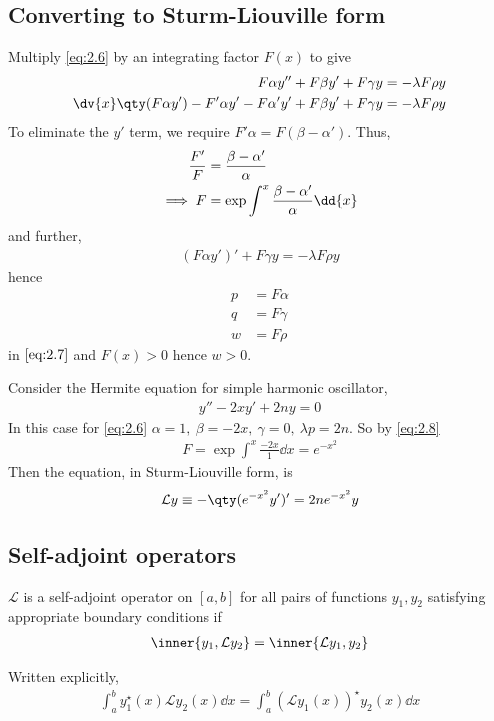 \subsection{Converting to Sturm-Liouville form}
Multiply \cref{eq:2.6} by an integrating factor $F(x)$ to give
\begin{align*}
    F \alpha y'' + F \beta y' + F \gamma y &= -\lambda F \rho y \\
    \dv{x} \qty(F \alpha y') - F' \alpha y' - F \alpha' y' + F \beta y' + F \gamma y &= -\lambda F \rho y
\end{align*}
To eliminate the $y'$ term, we require $F'\alpha = F(\beta - \alpha')$.
Thus,
\begin{align}
    \frac{F'}{F} &= \frac{\beta - \alpha'}{\alpha} \notag \\
    \implies F &= \exp \int^x \frac{\beta - \alpha'}{\alpha} \dd{x} \label{eq:2.8}
\end{align}
and further,
\begin{align*}
    (F\alpha y')' + F \gamma y = - \lambda F \rho y
\end{align*}
hence
\begin{align*}
    p & = F \alpha \\
    q & = F \gamma \\
    w & = F \rho
\end{align*} in $\cref{eq:2.7}$ and $F(x) > 0$ hence $w > 0$.
\begin{example}
    Consider the Hermite equation for simple harmonic oscillator,
    \begin{align*}
        y'' - 2xy' + 2ny = 0
    \end{align*}
    In this case for \cref{eq:2.6} $\alpha = 1,\ \beta = -2x,\ \gamma = 0,\ \lambda p = 2n$.
    So by \cref{eq:2.8}
    \begin{align*}
        F = \exp \int^x \frac{-2x}{1} \dd{x} = e^{-x^2}
    \end{align*}
    Then the equation, in Sturm-Liouville form, is
    \begin{align}
        \mathcal L y \equiv -\qty(e^{-x^2} y')' = 2n e^{-x^2} y \label{eq:2.9}
    \end{align}
\end{example}

\subsection{Self-adjoint operators}
\begin{definition}
    $\mathcal L$ is a self-adjoint operator on $[a,b]$ for all pairs of functions $y_1,y_2$ satisfying appropriate boundary conditions if
    \begin{align*}
        \inner{y_1, \mathcal L y_2} = \inner{\mathcal L y_1, y_2}
    \end{align*}
\end{definition}
Written explicitly,
\begin{align} \label{eq:2.10}
    \int_a^b y_1^\star(x) \mathcal L y_2(x) \dd{x} = \int_a^b (\mathcal L y_1(x))^\star y_2(x) \dd{x}
\end{align}

